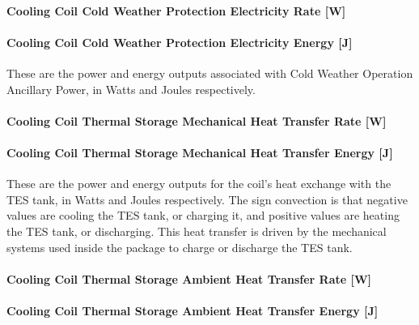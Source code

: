 \paragraph{Cooling Coil Cold Weather Protection Electricity Rate {[}W{]}}\label{cooling-coil-cold-weather-protection-electric-power-w}

\paragraph{Cooling Coil Cold Weather Protection Electricity Energy {[}J{]}}\label{cooling-coil-cold-weather-protection-electric-energy-j}

These are the power and energy outputs associated with Cold Weather Operation Ancillary Power, in Watts and Joules respectively.

\paragraph{Cooling Coil Thermal Storage Mechanical Heat Transfer Rate {[}W{]}}\label{cooling-coil-thermal-storage-mechanical-heat-transfer-rate-w}

\paragraph{Cooling Coil Thermal Storage Mechanical Heat Transfer Energy {[}J{]}}\label{cooling-coil-thermal-storage-mechanical-heat-transfer-energy-j}

These are the power and energy outputs for the coil's heat exchange with the TES tank, in Watts and Joules respectively. The sign convection is that negative values are cooling the TES tank, or charging it, and positive values are heating the TES tank, or discharging. This heat transfer is driven by the mechanical systems used inside the package to charge or discharge the TES tank.

\paragraph{Cooling Coil Thermal Storage Ambient Heat Transfer Rate {[}W{]}}\label{cooling-coil-thermal-storage-ambient-heat-transfer-rate-w}

\paragraph{Cooling Coil Thermal Storage Ambient Heat Transfer Energy {[}J{]}}\label{cooling-coil-thermal-storage-ambient-heat-transfer-energy-j}


